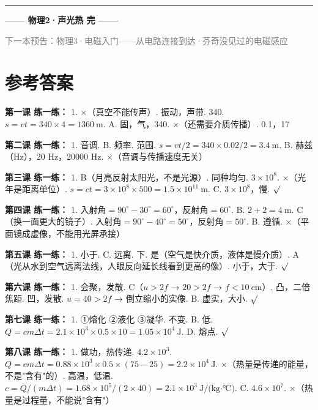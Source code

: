 \documentclass[a4paper,12pt]{ctexart}
\begin{document}
\vspace{0.5cm}

\begin{center}
\rule{0.7\textwidth}{1pt}

\vspace{0.4cm}
{\large\textcolor{blue!70!black}{\textbf{—— 物理2·声光热 完 ——}}}

\vspace{0.3cm}
\textcolor{gray}{\small 下一本预告：物理3·电磁入门——从电路连接到达·芬奇没见过的电磁感应}
\end{center}

\newpage
\section*{\textcolor{defblue}{参考答案}}

\textbf{第一课 练一练：}
1. ×（真空不能传声）. 振动，声带. 340. $s=vt=340\times4=1360\ \text{m}$. A. 固，气，340. ×（还需要介质传播）. 0.1，17

\textbf{第二课 练一练：}
1. 音调. B. 频率. 范围. $s=vt/2=340\times0.02/2=3.4\ \text{m}$. B. 赫兹（Hz），20 Hz，20000 Hz. ×（音调与传播速度无关）

\textbf{第三课 练一练：}
1. B（月亮反射太阳光，不是光源）. 同种均匀. $3\times10^8$. ×（光年是距离单位）. $s=ct=3\times10^8\times500=1.5\times10^{11}\ \text{m}$. C. $3\times10^8$，慢. $\surd$

\textbf{第四课 练一练：}
1. 入射角$=90^\circ-30^\circ=60^\circ$，反射角$=60^\circ$. B. $2+2=4\ \text{m}$. C（换一面更大的镜子）. 入射角$=90^\circ-40^\circ=50^\circ$，反射角$=50^\circ$. B. 遵循. ×（平面镜成虚像，不能用光屏承接）

\textbf{第五课 练一练：}
1. 小于. C. 远离. 下. 是（空气是快介质，液体是慢介质）. A（光从水到空气远离法线，人眼反向延长线看到更高的像）. 小于，大于. $\surd$

\textbf{第六课 练一练：}
1. 会聚，发散. C（$u>2f$ → $20>2f$ → $f<10\ \text{cm}$）. 凸，二倍焦距. 凹，发散. $u=40>2f$ → 倒立缩小的实像. B. 虚实，大小. $\surd$

\textbf{第七课 练一练：}
1. ①熔化 ②液化 ③凝华. 不变. B. 低. $Q=cm\Delta t=2.1\times10^3\times0.5\times10=1.05\times10^4\ \text{J}$. D. 熔点. $\surd$

\textbf{第八课 练一练：}
1. 做功，热传递. $4.2\times10^3$. $Q=cm\Delta t=0.88\times10^3\times0.5\times(75-25)=2.2\times10^4\ \text{J}$. ×（热量是传递的能量，不是"含有"的）. 高温，低温. $c=Q/(m\Delta t)=1.68\times10^5/(2\times40)=2.1\times10^3\ \text{J/(kg·℃)}$. C. $4.6\times10^7$. ×（热量是过程量，不能说"含有"）
\end{document}
